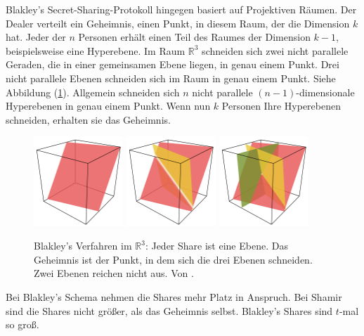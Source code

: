 \documentclass[12pt, a4paper, oneside, titlepage]{report}
\newcommand{\R}{\mathds{R}}
\theoremstyle{definition}
\begin{document}
		Blakley's Secret-Sharing-Protokoll hingegen basiert auf Projektiven Räumen. Der Dealer verteilt ein Geheimnis, einen Punkt, in diesem Raum, der die Dimension $ k $ hat. Jeder der $ n $ Personen erhält einen Teil des Raumes der Dimension $ k-1 $, beispielsweise eine Hyperebene. Im Raum $ \R^3 $ schneiden sich zwei nicht parallele Geraden, die in einer gemeinsamen Ebene liegen, in genau einem Punkt. Drei nicht parallele Ebenen schneiden sich im Raum in genau einem Punkt. Siehe Abbildung (\ref{bsp:blackley}). Allgemein schneiden sich $ n $ nicht parallele $ (n-1) $-dimensionale Hyperebenen in genau einem Punkt. Wenn nun $ k $ Personen Ihre Hyperebenen schneiden, erhalten sie das Geheimnis. \cite{blakley}\cite{quantum}
		\begin{figure}[H]
			\centering
			\includegraphics[width=0.3\textwidth]{images/blakley1.png}
			\includegraphics[width=0.3\textwidth]{images/blakley2.png}
			\includegraphics[width=0.3\textwidth]{images/blakley3.png}
			\caption{Blakley's Verfahren im $ \R^3 $: Jeder Share ist eine Ebene. Das Geheimnis ist der Punkt, in dem sich die drei Ebenen schneiden. Zwei Ebenen reichen nicht aus. Von \cite{blakley-images}.}
			\label{bsp:blackley}
		\end{figure}
		Bei Blakley's Schema nehmen die Shares mehr Platz in Anspruch. Bei Shamir sind die Shares nicht größer, als das Geheimnis selbst. Blakley's Shares sind $ t $-mal so groß. \cite{blakley}
\end{document}
